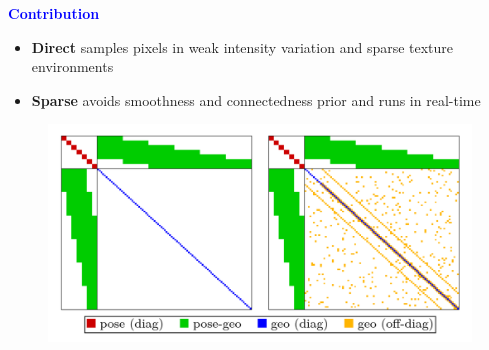 \documentclass[aspectratio=169]{beamer}
\begin{document}
\begin{frame}{\textcolor{blue}{\textbf{Contribution}}}
	\vspace{-0.5cm}
	\begin{block}{\textbf{\textcolor{teal}{}}}
	\begin{itemize}
			\item \textbf{Direct} samples pixels in weak intensity variation and sparse texture environments
			\item \textbf{Sparse} avoids smoothness and connectedness prior and runs in real-time
		\end{itemize}
	\end{block}

	\vspace{-0.4cm}

	\begin{figure}
		\centering
		\includegraphics[height=0.5\textheight]{pics/hessian_matrix_sparsity.png}
	\end{figure}

\end{frame}
\end{document}
